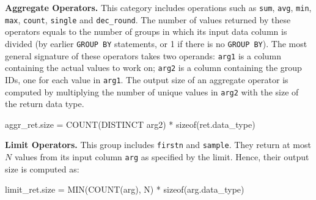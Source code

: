\documentclass[conference]{IEEEtran}
\def\Skip{\par\medskip\nobreak\noindent}
\begin{document}
\Skip\textbf{Aggregate Operators.}
This category includes operations such as \texttt{\small sum}, \texttt{\small avg}, \texttt{\small min}, \texttt{\small max}, \texttt{\small count}, \texttt{\small single} and \texttt{\small dec\_round}.
%
%
%
%
%
The number of values returned by these operators equals to the number of groups in which its input data column is divided (by earlier \texttt{\small GROUP BY} statements, or 1 if there is no \texttt{\small GROUP BY}).
The most general signature of these operators takes two operands: \texttt{\small arg1} is a column containing the actual values to work on; \texttt{\small arg2} is a column containing the group IDs, one for each value in \texttt{\small arg1}.
The output size of an aggregate operator is computed by multiplying the number of unique values in \texttt{\small arg2} with the size of the return data type.
\begin{verb}
aggr_ret.size = COUNT(DISTINCT arg2) * sizeof(ret.data_type)
\end{verb}

\Skip\textbf{Limit Operators.}
%
This group includes \texttt{\small firstn} and \texttt{\small sample}.
They return at most $N$ values from its input column \texttt{\small arg} as specified by the limit.
Hence, their output size is computed as:
\begin{verb}
limit_ret.size = MIN(COUNT(arg), N) * sizeof(arg.data_type)
\end{verb}
\end{document}
